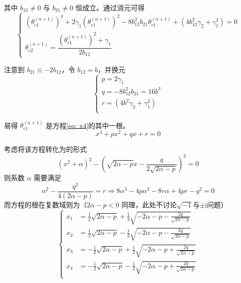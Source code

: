 \documentclass[UTF8]{ctexart}
\begin{document}
				其中 $b_{12} \neq 0$ 与 $b_{21} \neq 0$ 恒成立。通过消元可得
				\begin{equation}
					\begin{cases}
						(\theta_{c1}^{(n + 1)})^{4} + 2 \gamma_{1} (\theta_{c1}^{(n + 1)})^{2} - 8 b_{12}^{2} b_{21} \theta_{c1}^{(n + 1)} + (4 b_{12}^{2} \gamma_{2} + \gamma_{1}^{2}) = 0 \\
						\theta_{c2}^{(n + 1)} = \dfrac{(\theta_{c1}^{(n + 1)})^{2} + \gamma_1}{2 b_{12}}
					\end{cases}
					\label{eq: theta4}
				\end{equation}

				注意到 $b_{21} \equiv -2 b_{12}$，令 $b_{12} = b$，并换元
				\begin{equation}
					\begin{cases}
						p = 2 \gamma_{1}                          \\
						q = - 8 b_{12}^{2} b_{21} = 16 b^{3}      \\
						r = (4 b^{2} \gamma_{2} + \gamma_{1}^{2}) \\
					\end{cases}
					\label{eq: 4pqr}
				\end{equation}

				易得 $\theta_{c1}^{(n + 1)}$ 是方程\ref{eq: x4}的其中一根。
				\begin{equation}
					x^4 + p x^2 + q x + r = 0
					\label{eq: x4}
				\end{equation}

				考虑将该方程转化为的形式
				\begin{equation}
					(x^2 + \alpha)^2 - (\sqrt{2\alpha - p} x - \dfrac{q}{2\sqrt{2\alpha - p}})^2 = 0
				\end{equation}
				则系数 $\alpha$ 需要满足
				\begin{equation}
					\alpha^2 - \dfrac{q^2}{4 (2\alpha - p)} = r
					\Longrightarrow
					8 \alpha^3 - 4 p \alpha^2 - 8 r \alpha + 4 p r - q^2 = 0
					\label{eq: alpha_3rd}
				\end{equation}
				而方程的根在复数域则为（$2 \alpha - p <0$ 同理，此处不讨论$\sqrt{-1}$与$\pm \mathrm{i}$问题）
				\begin{equation}
					\begin{cases}
						x_1 & =  \frac{1}{2}\sqrt{2 \alpha - p} + \frac{1}{2} \sqrt{- 2 \alpha - p - \frac{2 q}{\sqrt{2 \alpha - p}}}  \\
						x_2 & =  \frac{1}{2}\sqrt{2 \alpha - p} - \frac{1}{2} \sqrt{- 2 \alpha - p - \frac{2 q}{\sqrt{2 \alpha - p}}}  \\
						x_3 & = -\frac{1}{2}\sqrt{2 \alpha - p} + \frac{1}{2} \sqrt{- 2 \alpha - p + \frac{2 q}{\sqrt{2 \alpha - p}}}  \\
						x_4 & = -\frac{1}{2}\sqrt{2 \alpha - p} - \frac{1}{2} \sqrt{- 2 \alpha - p + \frac{2 q}{\sqrt{2 \alpha - p}}}  \\
					\end{cases}
					\label{eq: x4_result}
				\end{equation}
\end{document}
